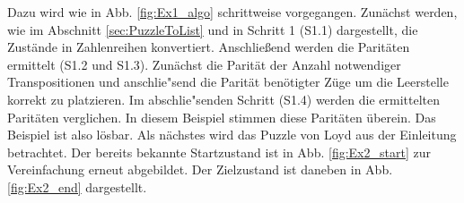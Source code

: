Dazu wird wie in Abb. \ref{fig:Ex1_algo} schrittweise vorgegangen. Zunächst werden, wie im Abschnitt \ref{sec:PuzzleToList} und in Schritt 1 (S1.1) dargestellt, die Zustände in Zahlenreihen konvertiert.
Anschließend werden die Paritäten ermittelt (S1.2 und S1.3). Zunächst die Parität der Anzahl notwendiger Transpositionen und anschlie"send die Parität benötigter Züge um die Leerstelle korrekt zu platzieren. Im abschlie"senden Schritt (S1.4) werden die ermittelten Paritäten verglichen. In diesem Beispiel stimmen diese Paritäten überein. Das Beispiel ist also lösbar.%
\WNL%
%
%
Als nächstes wird das Puzzle von Loyd aus der Einleitung betrachtet. Der bereits bekannte Startzustand ist in Abb. \ref{fig:Ex2_start} zur Vereinfachung erneut abgebildet. Der Zielzustand ist daneben in Abb. \ref{fig:Ex2_end} dargestellt.\\
